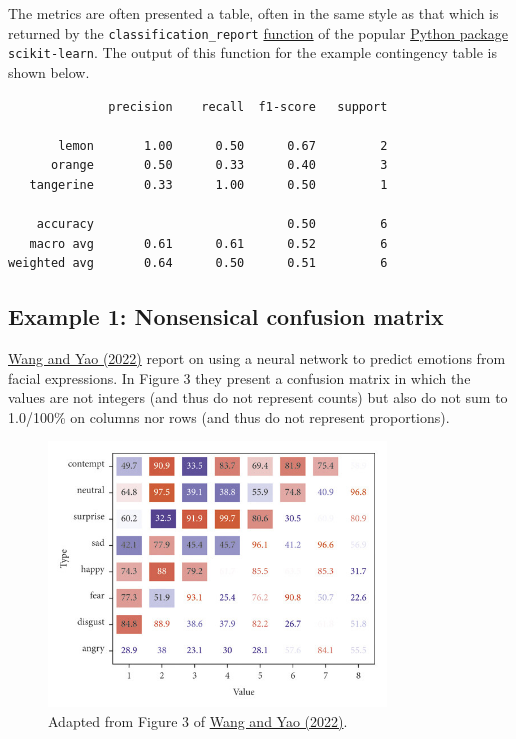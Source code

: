 \documentclass[letterpaper, 12pt]{article}
\begin{document}
The metrics are often presented a table, often in the same style as that which is returned by the \verb|classification_report| \href{https://scikit-learn.org/stable/modules/generated/sklearn.metrics.classification_report.html}{function} of the popular \href{https://scikit-learn.org/stable/index.html}{Python package} \verb|scikit-learn|. The output of this function for the example contingency table is shown below.
\begin{center}
\begin{verbatim}
              precision    recall  f1-score   support

       lemon       1.00      0.50      0.67         2
      orange       0.50      0.33      0.40         3
   tangerine       0.33      1.00      0.50         1

    accuracy                           0.50         6
   macro avg       0.61      0.61      0.52         6
weighted avg       0.64      0.50      0.51         6
\end{verbatim}
\end{center}

\pagebreak

\subsection*{Example 1: Nonsensical confusion matrix}

\href{https://doi.org/10.1155/2022/6451199}{Wang and Yao (2022)} report on using a neural network to predict emotions from facial expressions. In Figure 3 they present a confusion matrix in which the values are not integers (and thus do not represent counts) but also do not sum to 1.0/100\% on columns nor rows (and thus do not represent proportions).

\begin{figure}[h!tbp]
    \centering
    \includegraphics[width=0.8\textwidth]{img/multiclass_classifiers/wang_and_yao_fig_3.jpg}
    \caption*{Adapted from Figure 3 of \href{https://doi.org/10.1155/2022/6451199}{Wang and Yao (2022)}.}
\end{figure}
\end{document}
